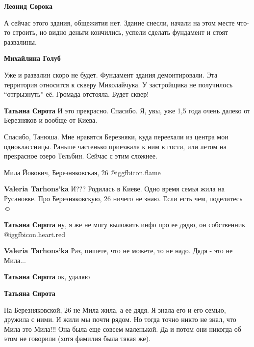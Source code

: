 \begin{itemize}
\begin{itemize} %
\textbf{Леонид Сорока} 

А сейчас этого здания, общежития нет. Здание снесли, начали на этом месте
что-то строить, но видно деньги кончились, успели сделать фундамент и стоят
развалины.

\textbf{Михайлина Голуб} 

Уже и развалин скоро не будет. Фундамент здания демонтировали.  Эта территория
относится к скверу Миколайчука. У застройщика не получилось
\enquote{отгрызнуть} её. Громада отстояла.  Будет сквер!

\textbf{Татьяна Сирота} И это прекрасно. Спасибо. Я, увы, уже 1,5 года очень
далеко от Березняков и вообще от Киева.
\end{itemize} %


Спасибо, Танюша. Мне нравятся Березняки, куда переехали из центра мои
одноклассницы. Раньше частенько приезжала к ним в гости, или летом на прекрасное
озеро Тельбин. Сейчас с этим сложнее.

Мила Йовович, Березняковская, 26 @igg{fbicon.flame} 

\begin{itemize} %
\textbf{Valeria Tarhons'ka} И???
Родилась в Киеве. Одно время семья жила на Русановке. Про Березняковскую, 26
ничего не знаю. Если есть чем, поделитесь ☺ ️ 

\textbf{Татьяна Сирота} ну, я же не могу выложить инфо про ее дядю, он собственник @igg{fbicon.heart.red}

\textbf{Valeria Tarhons'ka}
Раз, пишете, что не можете, то не надо.
Дядя - это не Мила...

\textbf{Татьяна Сирота} ок, удаляю

\textbf{Татьяна Сирота} 

На Березняковской, 26 не Мила жила, а ее дядя. Я знала его и его семью, дружила
с ними. И жили мы почти рядом. Но тогда точно никто не знал, что Мила это
Мила!!! Она была еще совсем маленькой. Да и потом они никогда об этом не
говорили (хотя фамилия была такая же).

\end{itemize} %



\end{itemize}
